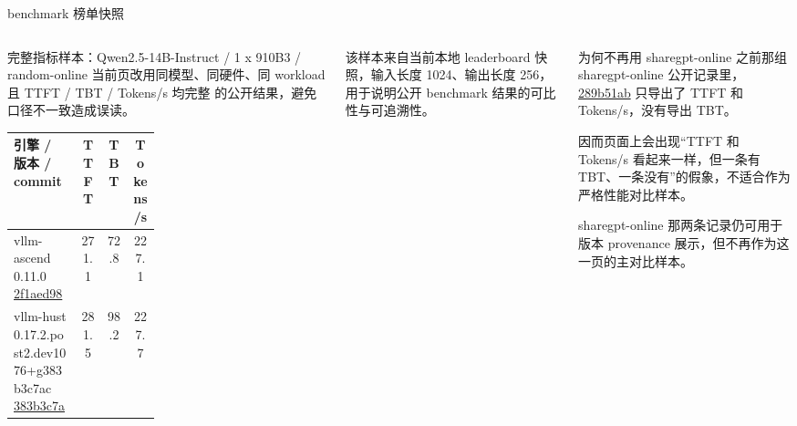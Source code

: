 \documentclass[aspectratio=169,11pt,fontset=none]{ctexbeamer}
\begin{document}
\begin{frame}{benchmark 榜单快照}
  \small
  \begin{columns}[T,onlytextwidth]
    \begin{block}{完整指标样本：Qwen2.5-14B-Instruct / 1 x 910B3 / random-online}
      \scriptsize
      当前页改用同模型、同硬件、同 workload 且 \alert{TTFT / TBT / Tokens/s 均完整} 的公开结果，避免口径不一致造成误读。

      \vspace{0.6em}
      \centering
      \begin{tabular}{|p{0.46\linewidth}|c|c|c|}
        \hline
        \textbf{引擎 / 版本 / commit} & \textbf{TTFT} & \textbf{TBT} & \textbf{Tokens/s} \\
        \hline
        \shortstack[l]{vllm-ascend\\0.11.0\\\href{https://github.com/vllm-project/vllm-ascend/commit/2f1aed98ccdb0fcbe1ff4fd0abab225bfd8d0367}{2f1aed98}} & 271.1 & 72.8 & 227.1 \\
        \hline
        \shortstack[l]{vllm-hust\\0.17.2.post2.dev1076+g383b3c7ac\\\href{https://github.com/vLLM-HUST/vllm-hust/commit/383b3c7acb08654da445c0048fc3f3eed9c4bb19}{383b3c7a}} & 281.5 & 98.2 & 227.7 \\
        \hline
      \end{tabular}
    \end{block}

    \vspace{0.35em}
    {\scriptsize 该样本来自当前本地 leaderboard 快照，输入长度 1024、输出长度 256，用于说明公开 benchmark 结果的可比性与可追溯性。}

    \begin{alertblock}{为何不再用 sharegpt-online}
      \scriptsize
      之前那组 sharegpt-online 公开记录里，\href{https://github.com/vLLM-HUST/vllm-hust/commit/289b51ab21d6f27abc043fd5917761b62c039871}{289b51ab} 只导出了 TTFT 和 Tokens/s，没有导出 TBT。

      因而页面上会出现“TTFT 和 Tokens/s 看起来一样，但一条有 TBT、一条没有”的假象，不适合作为严格性能对比样本。

      sharegpt-online 那两条记录仍可用于版本 provenance 展示，但不再作为这一页的主对比样本。
    \end{alertblock}
  \end{columns}

\end{frame}
\end{document}
